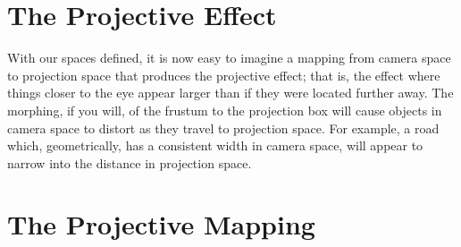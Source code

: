 \documentclass[12pt]{article}
\begin{document}
\section*{The Projective Effect}

With our spaces defined, it is now easy to imagine a mapping from camera space to projection space that produces the projective effect; that is, the effect where things closer to the eye appear larger than if they were located further away.  The morphing, if you will, of the frustum to the projection box will cause objects in camera space to distort as they travel to projection space.  For example, a road which, geometrically, has a consistent width in camera space, will appear to narrow into the distance in projection space.

\section*{The Projective Mapping}
\end{document}

